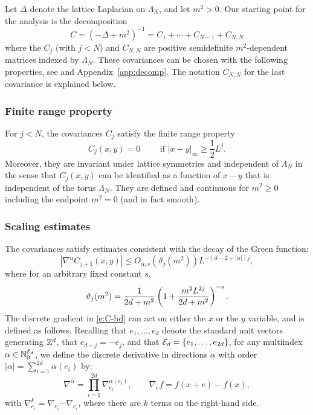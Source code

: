 \documentclass[11pt]{amsart}
\numberwithin{equation}{section}
\numberwithin{theorem}{section}
\newcommand{\1}{{\bf 1}}
\begin{document}
Let $\Delta$ denote the lattice Laplacian on $\Lambda_N$, and let $m^2>0$.
Our starting point for the analysis is the decomposition
\begin{equation} \label{e:C-def}
  C = (-\Delta+m^2)^{-1} = C_1 + \cdots +C_{N-1}+C_{N,N} 
\end{equation}
where the $C_j$ (with $j<N$) and $C_{N,N}$ are positive semidefinite $m^2$-dependent matrices indexed by $\Lambda_N$.
These covariances can be chosen with the following properties, see
\cite[Proposition~3.3.1 and Section~3.4]{MR3969983} and Appendix~\ref{app:decomp}.
The notation $C_{N,N}$ for the last covariance is explained below.

\subsubsection*{Finite range property}

For $j<N$, the covariances $C_j$ satisfy the finite range property
\begin{equation} \label{e:C-range}
  C_j(x,y) = 0 \qquad \text{ if } |x-y|_\infty \geq \frac12 L^{j}.
\end{equation}
Moreover, they are invariant under lattice symmetries and independent of $\Lambda_N$
in the sense that $C_j(x,y)$ can be identified as a function of $x-y$ that is independent of the torus $\Lambda_N$.
They are defined and continuous for $m^2\geq 0$ including the endpoint $m^2=0$ (and in fact smooth).

\subsubsection*{Scaling estimates}
The covariances satisfy estimates consistent with the decay of the Green function:
\begin{equation} \label{e:C-bd}
  |\nabla^\alpha C_{j+1}(x,y)| \leq O_{\alpha,s}(\vartheta_j(m^2)) L^{-(d-2+|\alpha|)j},
\end{equation}
where for an arbitrary fixed constant $s$,
\begin{equation}
  \vartheta_j(m^2)=\frac{1}{2d+m^2}\left({1+\frac{m^2L^{2j}}{2d+m^2}}\right)^{-s}.
\end{equation}
The discrete gradient in \eqref{e:C-bd} can act on either the $x$ or
the $y$ variable, and is defined as follows.  Recalling that
$e_1, \dots, e_d$ denote the standard unit vectors generating $\mathbb{Z}^d$,
that $e_{d+j}=-e_j$, and that $\mathcal E_d =\{e_1,\dots,e_{2d}\}$,
for any multiindex $\alpha\in \mathbb{N}_0^{\mathcal E_{d}}$, we define the
discrete derivative in directions $\alpha$ with order
$|\alpha|=\sum_{i=1}^{2d} \alpha(e_i)$ by:
\begin{equation}
  \nabla^\alpha=\prod_{i=1}^{2d} \nabla^{\alpha(e_i)}_{e_i}, \qquad \nabla_e f= f(x+e)-f(x),
\end{equation}
with $\nabla_{e_i}^{k} = \nabla_{e_i}\cdots \nabla_{e_i}$, where there are $k$ terms on the right-hand side.
\end{document}
